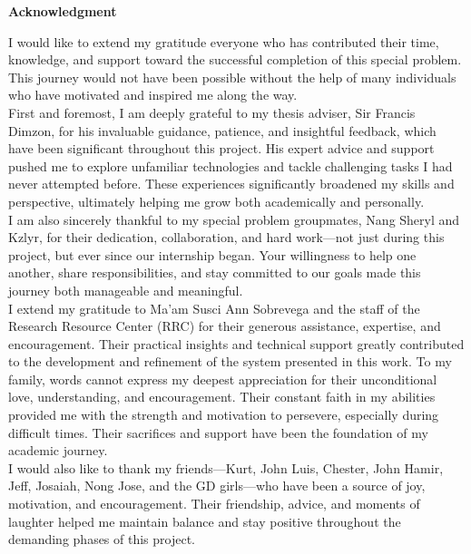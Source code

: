 \begin{center}
	\textbf{Acknowledgment}
\end{center}

I would like to extend my gratitude everyone who has contributed their time, knowledge, and support toward the successful completion of this special problem. This journey would not have been possible without the help of many individuals who have motivated and inspired me along the way.\\

First and foremost, I am deeply grateful to my thesis adviser, Sir Francis Dimzon, for his invaluable guidance, patience, and insightful feedback, which have been significant throughout this project. His expert advice and support pushed me to explore unfamiliar technologies and tackle challenging tasks I had never attempted before. These experiences significantly broadened my skills and perspective, ultimately helping me grow both academically and personally.\\

I am also sincerely thankful to my special problem groupmates, Nang Sheryl and Kzlyr, for their dedication, collaboration, and hard work—not just during this project, but ever since our internship began. Your willingness to help one another, share responsibilities, and stay committed to our goals made this journey both manageable and meaningful.\\

I extend my gratitude to Ma’am Susci Ann Sobrevega and the staff of the Research Resource Center (RRC) for their generous assistance, expertise, and encouragement. Their practical insights and technical support greatly contributed to the development and refinement of the system presented in this work.
To my family, words cannot express my deepest appreciation for their unconditional love, understanding, and encouragement. Their constant faith in my abilities provided me with the strength and motivation to persevere, especially during difficult times. Their sacrifices and support have been the foundation of my academic journey.\\

I would also like to thank my friends—Kurt, John Luis, Chester, John Hamir, Jeff, Josaiah, Nong Jose, and the GD girls—who have been a source of joy, motivation, and encouragement. Their friendship, advice, and moments of laughter helped me maintain balance and stay positive throughout the demanding phases of this project.\\

